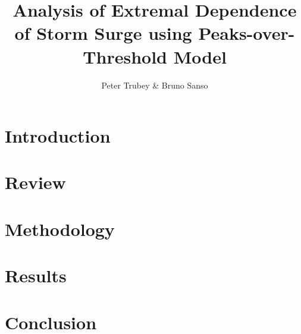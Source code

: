 \documentclass{article}
\title{Analysis of Extremal Dependence of Storm Surge using Peaks-over-Threshold Model}
\author{Peter Trubey \& Bruno Sanso}
\date{}
\begin{document}
\maketitle

\begin{abstract}
    
\end{abstract}

\section{Introduction\label{ref:introduction}}


\section{Review\label{ref:review}}


\section{Methodology\label{ref:methodology}}


\section{Results\label{ref:results}}


\section{Conclusion\label{ref:conclusion}}


\appendix




\end{document}
